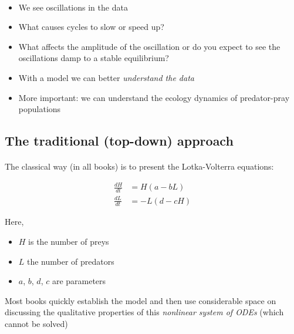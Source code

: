\documentclass[%
twoside,                 %
final,                   %
10pt]{article}
\begin{document}
\paragraph{}
\begin{itemize}
 \item We see oscillations in the data

 \item What causes cycles to slow or speed up?

 \item What affects the amplitude of the oscillation or do you expect to see the oscillations damp to a stable equilibrium?

 \item With a model we can better \emph{understand the data}

 \item More important: we can understand the ecology dynamics of
   predator-pray populations
\end{itemize}

\noindent




\subsection*{The traditional (top-down) approach}


\paragraph{}
The classical way (in all books) is to present the Lotka-Volterra equations:

\begin{align*}
\frac{dH}{dt} &= H(a - b L)\\ 
\frac{dL}{dt} &= - L(d - c  H)
\end{align*}

Here,

\begin{itemize}
 \item $H$ is the number of preys

 \item $L$ the number of predators

 \item $a$, $b$, $d$, $c$ are parameters
\end{itemize}

\noindent
Most books quickly establish the model and then use considerable space on
discussing the qualitative properties of this \emph{nonlinear system of
ODEs} (which cannot be solved)
\end{document}
